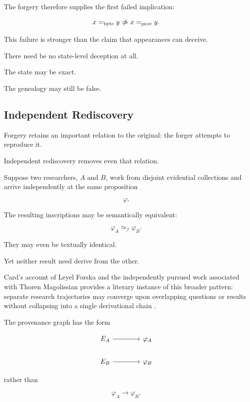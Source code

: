 \documentclass[
  11pt,
  a4paper,
  DIV=12,
  BCOR=0mm,
  parskip=half-
]{scrartcl}
\newcommand{\Inv}{\mathcal I}
\newcommand{\eqbyte}{=_{\mathrm{byte}}}
\newcommand{\eqprov}{=_{\mathrm{prov}}}
\newcommand{\simI}{\simeq_{\Inv}}
\newcommand{\nimplies}{%
  \centernot\Rightarrow
}
\theoremstyle{definition}
\theoremstyle{plain}
\theoremstyle{remark}
\begin{document}
The forgery therefore supplies the first failed implication:

\[
  x\eqbyte y
  \nimplies
  x\eqprov y.
\]

This failure is stronger than the claim that appearances can deceive.

There need be no state-level deception at all.

The state may be exact.

The genealogy may still be false.


\subsection{Independent Rediscovery}
\label{sec:independent-rediscovery}

Forgery retains an important relation to the original: the forger attempts to
reproduce it.

Independent rediscovery removes even that relation.

Suppose two researchers, \(A\) and \(B\), work from disjoint evidential
collections and arrive independently at the same proposition

\[
  \varphi.
\]

The resulting inscriptions may be semantically equivalent:

\[
  \varphi_A\simI\varphi_B.
\]

They may even be textually identical.

Yet neither result need derive from the other.

Card's account of Leyel Forska and the independently pursued work associated
with Thoren Magolissian provides a literary instance of this broader pattern:
separate research trajectories may converge upon overlapping questions or
results without collapsing into a single derivational chain
\cite{card1989}.

The provenance graph has the form

\[
\begin{tikzcd}[column sep=4em,row sep=1.7em]
E_A \arrow[r] & \varphi_A \\
E_B \arrow[r] & \varphi_B
\end{tikzcd}
\]

rather than

\[
  \varphi_A\longrightarrow\varphi_B.
\]
\end{document}
